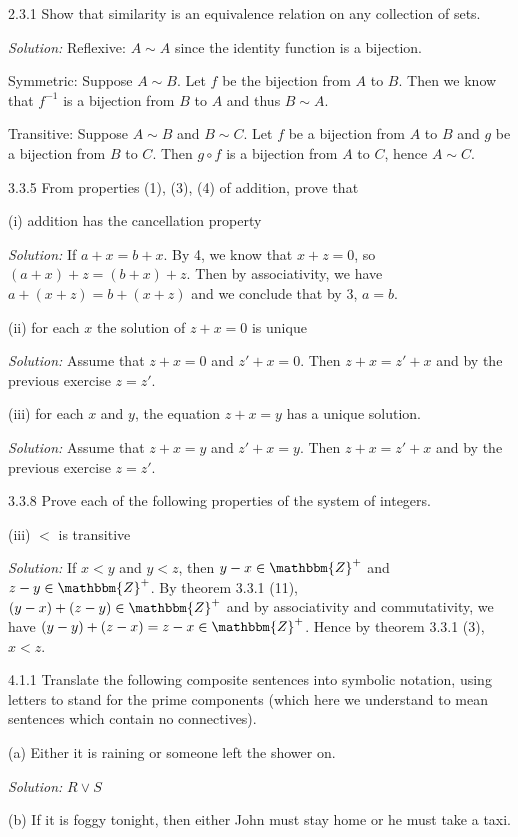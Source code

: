 \documentclass{letter}
\newcommand{\tmem}[1]{{\em #1\/}}
\begin{document}
2.3.1 Show that similarity is an equivalence relation on any collection of
sets.

{\tmem{Solution:}} Reflexive: $A \sim A$ since the identity function is a
bijection.

Symmetric: Suppose $A \sim B$. Let $f$ be the bijection from $A$ to $B$. Then
we know that $f^{- 1}$ is a bijection from $B$ to $A$ and thus $B \sim A$.

Transitive: Suppose $A \sim B$ and $B \sim C$. Let $f$ be a bijection from $A$
to $B$ and $g$ be a bijection from $B$ to $C$. Then $g \circ f$ is a bijection
from $A$ to $C$, hence $A \sim C$.

3.3.5 From properties (1), (3), (4) of addition, prove that

(i) addition has the cancellation property

{\tmem{Solution:}} If $a + x = b + x$. By 4, we know that $x + z = 0$, so $(a
+ x) + z = (b + x) + z$. Then by associativity, we have $a + (x + z) = b + (x
+ z)$ and we conclude that by 3, $a = b$.

(ii) for each $x$ the solution of $z + x = 0$ is unique

{\tmem{Solution:}} Assume that $z + x = 0$ and $z' + x = 0$. Then $z + x = z'
+ x$ and by the previous exercise $z = z'$.

(iii) for each $x$ and $y$, the equation $z + x = y$ has a unique solution.

{\tmem{Solution:}} Assume that $z + x = y$ and $z' + x = y$. Then $z + x = z'
+ x$ and by the previous exercise $z = z'$.

3.3.8 Prove each of the following properties of the system of integers.

(iii) $<$ is transitive

{\tmem{Solution:}} If $x < y$ and $y < z$, then $y - x \in \mathbbm{Z}^+$ and
$z - y \in \mathbbm{Z}^+$. By theorem 3.3.1 (11), $(y - x) + (z - y) \in
\mathbbm{Z}^+$ and by associativity and commutativity, we have $(y - y) + (z -
x) = z - x \in \mathbbm{Z}^+$. Hence by theorem 3.3.1 (3), $x < z$.

4.1.1 Translate the following composite sentences into symbolic notation,
using letters to stand for the prime components (which here we understand to
mean sentences which contain no connectives).

(a) Either it is raining or someone left the shower on.

{\tmem{Solution:}} $R \vee S$

(b) If it is foggy tonight, then either John must stay home or he must take a
taxi.
\end{document}

